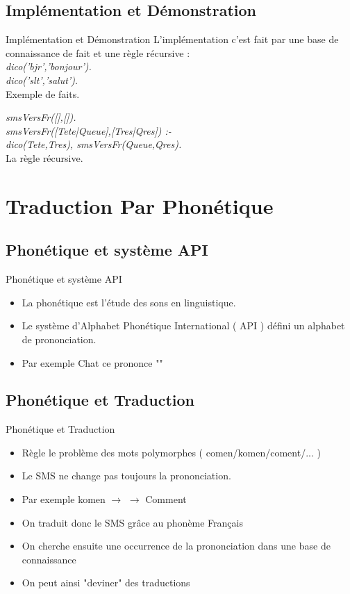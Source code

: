 \documentclass{beamer}
\begin{document}
\subsection{Implémentation et Démonstration}
\begin{frame}{Implémentation et Démonstration}
	L'implémentation c'est fait par une base de connaissance de fait et une règle récursive :\\
	\medskip
	\emph{dico('bjr','bonjour').\\
	dico('slt','salut').\\}
	\smallskip
	\small{Exemple de faits.\\}
	
	\bigskip
	
	\emph{smsVersFr([],[]).\\
	smsVersFr([Tete|Queue],[Tres|Qres]) :-\\
        dico(Tete,Tres), smsVersFr(Queue,Qres).\\}
    \smallskip
    \small{La règle récursive.}
	
	
\end{frame}


\section{Traduction Par Phonétique}

\subsection{Phonétique et système API}
\begin{frame}{Phonétique et système API}
	\begin{itemize}
		\item La phonétique est l'étude des sons en linguistique.
		\item Le système d'Alphabet Phonétique International ( API ) défini un alphabet de prononciation.
		\item Par exemple Chat ce prononce ""
	\end{itemize}
\end{frame}

\subsection{Phonétique et Traduction}
\begin{frame}{Phonétique et Traduction}
	\begin{itemize}
		\item Règle le problème des mots polymorphes ( comen/komen/coment/... )
		\item Le SMS ne change pas toujours la prononciation.
		\item Par exemple komen $\rightarrow$  $\rightarrow$ Comment
		\item On traduit donc le SMS grâce au phonème Français
		\item On cherche ensuite une occurrence de la prononciation dans une base de connaissance
		\item On peut ainsi "deviner" des traductions
	\end{itemize}
\end{frame}
\end{document}
